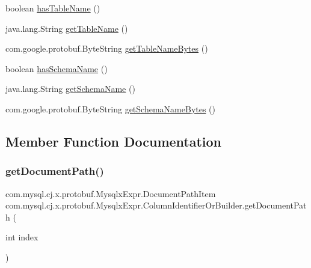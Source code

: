\begin{DoxyCompactItemize}
\item 
boolean \mbox{\hyperlink{interfacecom_1_1mysql_1_1cj_1_1x_1_1protobuf_1_1_mysqlx_expr_1_1_column_identifier_or_builder_a5b032f4d4832a223b8cba49405d8be69}{has\+Table\+Name}} ()
\item 
java.\+lang.\+String \mbox{\hyperlink{interfacecom_1_1mysql_1_1cj_1_1x_1_1protobuf_1_1_mysqlx_expr_1_1_column_identifier_or_builder_a2ae6a1b034bc838e9f6f918792dc9cf3}{get\+Table\+Name}} ()
\item 
com.\+google.\+protobuf.\+Byte\+String \mbox{\hyperlink{interfacecom_1_1mysql_1_1cj_1_1x_1_1protobuf_1_1_mysqlx_expr_1_1_column_identifier_or_builder_a0fdd96aaff2ff9c8f6e82ef777aa9102}{get\+Table\+Name\+Bytes}} ()
\item 
boolean \mbox{\hyperlink{interfacecom_1_1mysql_1_1cj_1_1x_1_1protobuf_1_1_mysqlx_expr_1_1_column_identifier_or_builder_ab66ff6a0ae1fa963704ce3cc7d943dd0}{has\+Schema\+Name}} ()
\item 
java.\+lang.\+String \mbox{\hyperlink{interfacecom_1_1mysql_1_1cj_1_1x_1_1protobuf_1_1_mysqlx_expr_1_1_column_identifier_or_builder_a2e4a5599737ed10e36c42a3907991b51}{get\+Schema\+Name}} ()
\item 
com.\+google.\+protobuf.\+Byte\+String \mbox{\hyperlink{interfacecom_1_1mysql_1_1cj_1_1x_1_1protobuf_1_1_mysqlx_expr_1_1_column_identifier_or_builder_a55864998afe131433a649d5d2fd2f09a}{get\+Schema\+Name\+Bytes}} ()
\end{DoxyCompactItemize}


\subsection{Member Function Documentation}
\mbox{\label{interfacecom_1_1mysql_1_1cj_1_1x_1_1protobuf_1_1_mysqlx_expr_1_1_column_identifier_or_builder_afc7fad42604b468396fdc8b941d5b1e7}} 
\subsubsection{\texorpdfstring{get\+Document\+Path()}{getDocumentPath()}}
{\footnotesize\ttfamily com.\+mysql.\+cj.\+x.\+protobuf.\+Mysqlx\+Expr.\+Document\+Path\+Item com.\+mysql.\+cj.\+x.\+protobuf.\+Mysqlx\+Expr.\+Column\+Identifier\+Or\+Builder.\+get\+Document\+Path (\begin{DoxyParamCaption}\item[{int}]{index }\end{DoxyParamCaption})}

